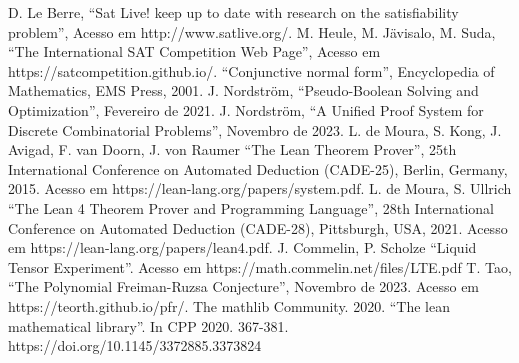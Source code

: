 \documentclass[conference]{IEEEtran}
\begin{document}

\begin{thebibliography}{00}
           D. Le Berre, ``Sat Live! keep up to date with research on the satisfiability problem'', Acesso em http://www.satlive.org/.
           M. Heule, M. Jävisalo, M. Suda, ``The International SAT Competition Web Page'', Acesso em https://satcompetition.github.io/.
               ``Conjunctive normal form'', Encyclopedia of Mathematics, EMS Press, 2001.
           J. Nordström, ``Pseudo-Boolean Solving and Optimization'', Fevereiro de 2021.
          J. Nordström, ``A Unified Proof System for Discrete Combinatorial Problems'', Novembro de 2023.
        L. de Moura, S. Kong, J. Avigad, F. van Doorn, J. von Raumer ``The Lean Theorem Prover'', 25th International Conference on Automated Deduction (CADE-25), Berlin, Germany, 2015. Acesso em https://lean-lang.org/papers/system.pdf.
             L. de Moura, S. Ullrich ``The Lean 4 Theorem Prover and Programming Language'', 28th International Conference on Automated Deduction (CADE-28), Pittsburgh, USA, 2021. Acesso em https://lean-lang.org/papers/lean4.pdf.
               J. Commelin, P. Scholze ``Liquid Tensor Experiment''. Acesso em https://math.commelin.net/files/LTE.pdf
               T. Tao, ``The Polynomial Freiman-Ruzsa Conjecture'', Novembro de 2023. Acesso em https://teorth.github.io/pfr/.
          The mathlib Community. 2020. ``The lean mathematical library''. In CPP 2020. 367-381. https://doi.org/10.1145/3372885.3373824
\end{thebibliography}

\newpage
\onecolumn
\appendix
\end{document}
